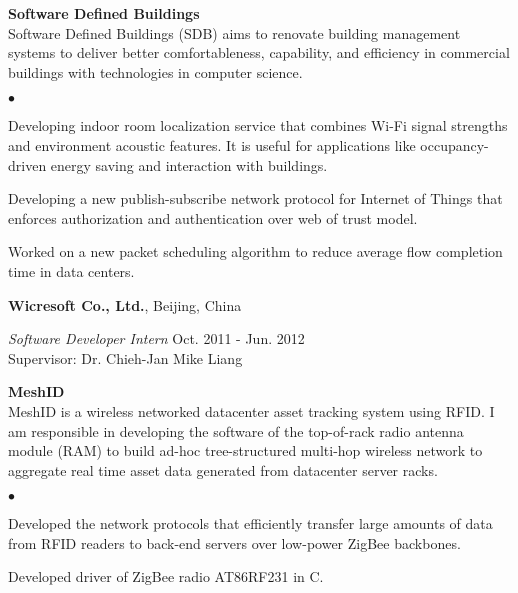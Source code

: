 \documentclass[margin,line]{res}
\newenvironment{list1}{
  \begin{list}{\ding{113}}{
      \setlength{\itemsep}{0in}
      \setlength{\parsep}{0in} \setlength{\parskip}{0in}
      \setlength{\topsep}{0in} \setlength{\partopsep}{0in}
      \setlength{\leftmargin}{0.17in}}}{\end{list}}
\newenvironment{list2}{
  \begin{list}{$\bullet$}{
      \setlength{\itemsep}{0in}
      \setlength{\parsep}{0in} \setlength{\parskip}{0in}
      \setlength{\topsep}{0in} \setlength{\partopsep}{0in}
      \setlength{\leftmargin}{0.2in}}}{\end{list}}
\begin{document}
\begin{resume}
      \vspace*{-.1in}
      \begin{list1}
        \item[] {\bf Software Defined Buildings}\\
        Software Defined Buildings (SDB) aims to renovate building management systems to deliver better comfortableness, capability, and efficiency in commercial buildings with technologies in computer science.
        \vspace*{.05in}
        \begin{list2}
          \item Developing indoor room localization service that combines Wi-Fi signal strengths and environment acoustic features. It is useful for applications like occupancy-driven energy saving and interaction with buildings.
          \item Developing a new publish-subscribe network protocol for Internet of Things that enforces authorization and authentication over web of trust model.
          \item Worked on a new packet scheduling algorithm to reduce average flow completion time in data centers.
        \end{list2}
      \end{list1}


      {\bf Wicresoft Co., Ltd.}, Beijing, China

      \vspace{-.3cm}
      {\em Software Developer Intern} \hfill Oct. 2011 - Jun. 2012\\
      Supervisor: Dr. Chieh-Jan Mike Liang\\

      \vspace*{-.1in}
      \begin{list1}
        \item[] {\bf MeshID}\\
        MeshID is a wireless networked datacenter asset tracking system using RFID. I am responsible in developing the software of the top-of-rack radio antenna module (RAM) to build ad-hoc tree-structured multi-hop wireless network to aggregate real time asset data generated from datacenter server racks.
        \vspace*{.05in}
        \begin{list2}
          \item Developed the network protocols that efficiently transfer large amounts of data from RFID readers to back-end servers over low-power ZigBee backbones.
          \item Developed driver of ZigBee radio AT86RF231 in C.
        \end{list2}
      \end{list1}



\end{resume}
\end{document}
